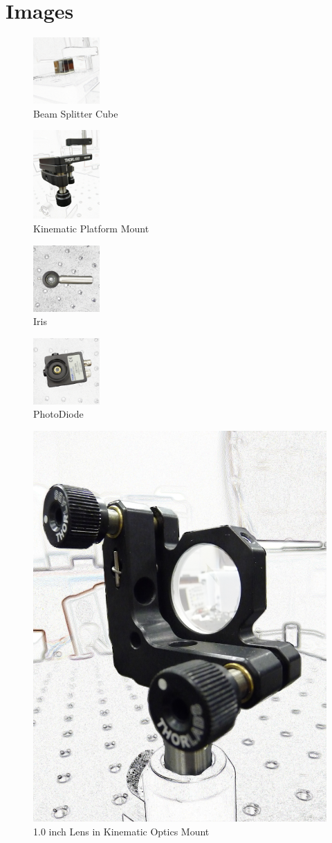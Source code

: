 \section{Images}

\begin{figure}[!ht]
\centering
\includegraphics[width=1in]{BeamSplitterCube}
\caption{Beam Splitter Cube}
\label{fig:beamsplittercube}
\end{figure}

\begin{figure}[!ht]
\centering
\includegraphics[width=1in]{KinematicPlatformMount}
\caption{Kinematic Platform Mount}
\label{fig:kinematicplatformmount}
\end{figure}

\begin{figure}[!ht]
\centering
\includegraphics[width=1in]{Iris}
\caption{Iris}
\label{fig:iris}
\end{figure}

\begin{figure}[!ht]
\centering
\includegraphics[width=1in]{PhotoDiode}
\caption{PhotoDiode}
\label{fig:phtodiode}
\end{figure}

\begin{figure}[!ht]
\centering
\includegraphics[width=1 in]{LensinHolder}
\caption{1.0 inch Lens in Kinematic Optics Mount}
\label{fig:lens}
\end{figure}


